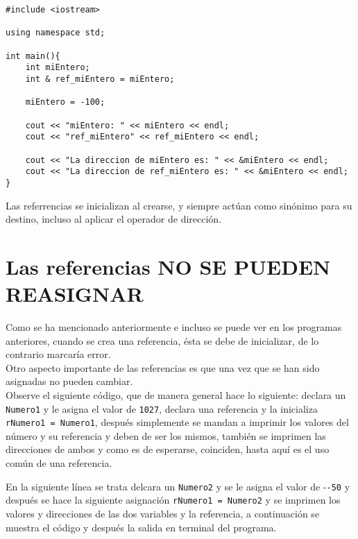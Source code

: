 \documentclass[12pt]{extarticle}
\newcommand{\<}{\langle}
\renewcommand{\>}{\rangle}
\theoremstyle{definition}
\begin{document}
\begin{lstlisting}
#include <iostream>

using namespace std; 

int main(){
	int miEntero;
	int & ref_miEntero = miEntero;
	
	miEntero = -100;
	
	cout << "miEntero: " << miEntero << endl; 
	cout << "ref_miEntero" << ref_miEntero << endl; 
	
	cout << "La direccion de miEntero es: " << &miEntero << endl; 
	cout << "La direccion de ref_miEntero es: " << &miEntero << endl; 
}
\end{lstlisting}

Las referrencias se inicializan al crearse, y siempre actúan como sinónimo para su destino, incluso al aplicar el operador de dirección.\\ 

\section{Las referencias NO SE PUEDEN REASIGNAR}

Como se ha mencionado anteriormente e incluso se puede ver en los programas anteriores, cuando se crea una referencia, ésta se debe de inicializar, de lo contrario marcaría error. \\

Otro aspecto importante de las referencias es que una vez que se han sido asignadas no pueden cambiar.\\


Observe el siguiente código, que de manera general hace lo siguiente: declara un \verb|Numero1| y le asigna el valor de \verb|1027|, declara una referencia y la inicializa \verb|rNumero1 = Numero1|, después simplemente se mandan a imprimir los valores del número y su referencia y deben de ser los mismos, también se imprimen las direcciones de ambos y como es de esperarse, coinciden, hasta aquí es el uso común de una referencia. 

En la siguiente línea se trata delcara un \verb|Numero2| y se le asigna el valor de -\verb|-50| y después se hace la siguiente asignación \verb|rNumero1 = Numero2| y se imprimen los valores y direcciones de las dos variables y la referencia, a continuación se muestra el código y después la salida en terminal del programa. 
\end{document}

